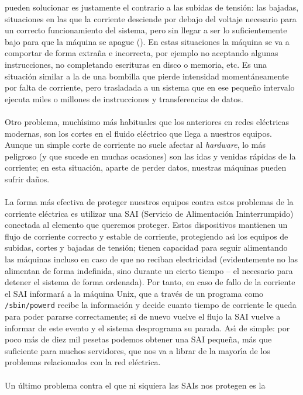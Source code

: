 pueden solucionar es justamente el contrario a las subidas de tensi\'on: las
bajadas, situaciones en las que la corriente desciende por debajo del voltaje
necesario para un correcto funcionamiento del sistema, pero sin llegar a ser
lo suficientemente bajo para que la m\'aquina se apague (\cite{kn:san90}). En
estas situaciones la m\'aquina se va a comportar de forma extra\~na e 
incorrecta, por ejemplo no aceptando algunas instrucciones, no completando 
escrituras en disco o memoria, etc. Es una situaci\'on similar a la de una 
bombilla que pierde intensidad moment\'aneamente por falta de corriente, pero
trasladada a un sistema que en ese peque\~no intervalo ejecuta miles o millones
de instrucciones y transferencias de datos.\\
\\Otro problema, much\'{\i}simo m\'as habituales que los anteriores en redes
el\'ectricas modernas, son los cortes
en el fluido el\'ectrico que llega a nuestros equipos. Aunque un simple corte
de corriente no suele afectar al {\it hardware}, lo m\'as peligroso (y que
sucede en muchas ocasiones) son las idas y venidas r\'apidas de la corriente;
en esta situaci\'on, aparte de perder datos, nuestras m\'aquinas pueden sufrir
da\~nos.\\
\\La forma m\'as efectiva de proteger nuestros equipos contra estos problemas
de la corriente el\'ectrica es utilizar una SAI (Servicio de Alimentaci\'on
Ininterrumpido) conectada al elemento que queremos proteger. Estos dispositivos
mantienen un flujo de corriente correcto y estable de corriente, protegiendo 
as\'{\i} los equipos de subidas, cortes y bajadas de tensi\'on; tienen capacidad
para seguir alimentando las m\'aquinas incluso en caso de que no reciban 
electricidad (evidentemente no las alimentan de forma indefinida, sino durante
un cierto tiempo -- el necesario para detener el sistema de forma ordenada). 
Por tanto, en caso de fallo de la corriente el SAI informar\'a a la m\'aquina
Unix, que a trav\'es de un programa como {\tt /sbin/powerd} recibe la 
informaci\'on y decide cuanto tiempo de corriente le queda para poder pararse
correctamente; si de nuevo vuelve el flujo la SAI vuelve a informar de este
evento y el sistema desprograma su parada. As\'{\i} de simple: por poco m\'as
de diez mil pesetas podemos obtener una SAI peque\~na, m\'as que suficiente para
muchos servidores, que nos va a librar de la mayor\'{\i}a de los problemas
relacionados con la red el\'ectrica.\\
\\Un \'ultimo problema contra el que ni siquiera las SAIs nos protegen es la 

